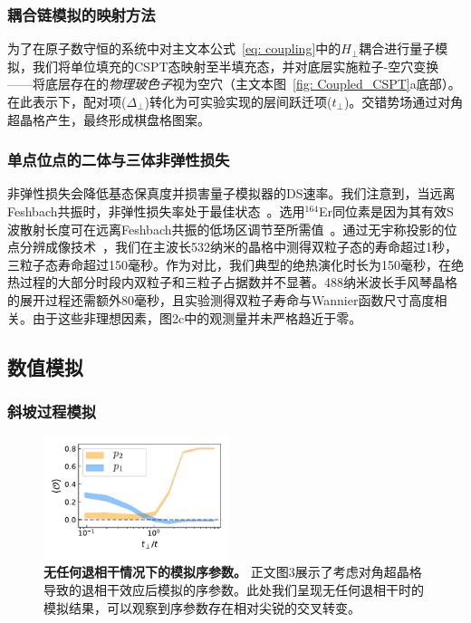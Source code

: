\documentclass[preprint,superscriptaddress,floatfix,nofootinbib]{revtex4-2}
\begin{document}
\subsubsection*{耦合链模拟的映射方法}

为了在原子数守恒的系统中对主文本公式~\eqref{eq: coupling}中的$H_\perp$耦合进行量子模拟，我们将单位填充的CSPT态映射至半填充态，并对底层实施粒子-空穴变换——将底层存在的\textit{物理玻色子}视为空穴（主文本图~\ref{fig: Coupled_CSPT}a底部）。在此表示下，配对项($\Delta_\perp$)转化为可实验实现的层间跃迁项($t_\perp$)。交错势场通过对角超晶格产生，最终形成棋盘格图案。
\subsubsection*{单点位点的二体与三体非弹性损失}

非弹性损失会降低基态保真度并损害量子模拟器的DS速率。我们注意到，当远离Feshbach共振时，非弹性损失率处于最佳状态~\cite{Chin2010, Frisch2014}。选用$^{164}$Er同位素是因为其有效S波散射长度可在远离Feshbach共振的低场区调节至所需值~\cite{Patscheider2022}。通过无宇称投影的位点分辨成像技术~\cite{Su2024}，我们在主波长532纳米的晶格中测得双粒子态的寿命超过1秒，三粒子态寿命超过150毫秒。作为对比，我们典型的绝热演化时长为150毫秒，在绝热过程的大部分时段内双粒子和三粒子占据数并不显著。488纳米波长手风琴晶格的展开过程还需额外80毫秒，且实验测得双粒子寿命与Wannier函数尺寸高度相关。由于这些非理想因素，图2c中的观测量并未严格趋近于零。
\subsection*{数值模拟}


\subsubsection*{斜坡过程模拟}
\begin{figure}
    \centering
    \includegraphics[width=0.48\textwidth]{figures/Coupled_CSPT_OP_gnd_state_no_decoherence.pdf}
    \caption{\textbf{无任何退相干情况下的模拟序参数。} 正文图3展示了考虑对角超晶格导致的退相干效应后模拟的序参数。此处我们呈现无任何退相干时的模拟结果，可以观察到序参数存在相对尖锐的交叉转变。
    }
    \label{fig: Coupled_CSPT_no_decoherence}
\end{figure}
\end{document}
